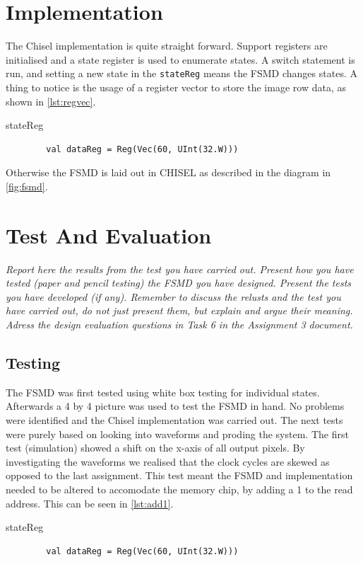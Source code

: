 \documentclass[a4paper, english]{article}
\numberwithin{equation}{section}
\begin{document}
\section{Implementation}
The Chisel implementation is quite straight forward. Support registers are initialised and a state register is used to enumerate states. A switch statement is run, and setting a new state in the \texttt{stateReg} means the FSMD changes states. A thing to notice is the usage of a register vector to store the image row data, as shown in \cref{lst:regvec}.
\begin{listing}[H]
    \centering
    \caption{stateReg}\label{lst:regvec}
    \begin{verbatim}
        val dataReg = Reg(Vec(60, UInt(32.W)))
\end{verbatim}
\end{listing}
Otherwise the FSMD is laid out in CHISEL as described in the diagram in \cref{fig:fsmd}.
\section{Test And Evaluation}
\textit{Report here the results from the test you have carried out. Present how you have tested (paper and pencil testing) the FSMD you have designed. Present the tests you have developed (if any). Remember to discuss the relusts and the test you have carried out, do not just present them, but explain and argue their meaning. Adress the design evaluation questions in Task 6 in the Assignment 3 document.}
\subsection{Testing}
The FSMD was first tested using white box testing for individual states. Afterwards a 4 by 4 picture was used to test the FSMD in hand. No problems were identified and the Chisel implementation was carried out. The next tests were purely based on looking into waveforms and proding the system. The first test (simulation) showed a shift on the x-axis of all output pixels. By investigating the waveforms we realised that the clock cycles are skewed as opposed to the last assignment. This test meant the FSMD and implementation needed to be altered to accomodate the memory chip, by adding a 1 to the read address. This can be seen in \cref{lst:add1}.
\begin{listing}[H]
    \centering
    \caption{stateReg}\label{lst:regvec}
    \begin{verbatim}
        val dataReg = Reg(Vec(60, UInt(32.W)))
\end{verbatim}
\end{listing}
\end{document}
